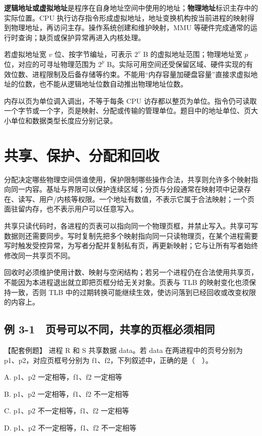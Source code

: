 \textbf{逻辑地址或虚拟地址}是程序在自身地址空间中使用的地址；\textbf{物理地址}标识主存中的实际位置。CPU 执行访存指令形成虚拟地址，地址变换机构按当前进程的映射得到物理地址，再访问主存。操作系统创建和维护映射，MMU 等硬件完成通常的运行时查询；缺页或保护异常再进入内核处理。

若虚拟地址宽 \(v\) 位、按字节编址，可表示 \(2^v\) B 的虚拟地址范围；物理地址宽 \(p\) 位，对应的可寻址物理范围为 \(2^p\) B。实际可用空间还受保留区域、硬件实现的有效位数、进程限制及后备存储等约束。不能用``内存容量加硬盘容量''直接求虚拟地址的位数，也不能从逻辑地址位数自动推出物理地址位数。

内存以页为单位调入调出，不等于每条 CPU 访存都以整页为单位。指令仍可读取一个字节或一个字，页是映射、分配或传输的管理单位。题目中的地址单位、页大小单位和数据类型长度应分别记录。

\section{共享、保护、分配和回收}\label{OS03-5-2}

分配决定哪些物理空间供谁使用，保护限制哪些操作合法，共享则允许多个映射指向同一内容。基址与界限可以保护连续区域；分页与分段通常在映射项中记录存在、读写、用户/内核等权限。一个地址有数值，不表示它属于合法映射；一个页面驻留内存，也不表示用户可以任意写入。

共享只读代码时，各进程的页表可以指向同一个物理页框，并禁止写入。共享可写数据则还需要同步。写时复制先把多个映射指向同一只读物理页，在某个进程需要写时触发受控异常，为写者分配并复制私有页，再更新映射；它与让所有写者始终修改同一共享页不同。

回收时必须维护使用计数、映射与空闲结构；若另一个进程仍在合法使用共享页，不能因为本进程退出就立即把页框分给无关对象。页表与 TLB 的映射变化也须保持一致，否则 TLB 中的过期转换可能继续生效，使访问落到已经回收或改变权限的内容上。

\subsection{例 3-1　页号可以不同，共享的页框必须相同}\label{OS03-ex5-1}

\begin{example}[配套例题]

【配套例题】 进程 R 和 S 共享数据 data。若 data 在两进程中的页号分别为 p1、p2，对应页框号分别为 f1、f2，下列叙述中，正确的是（　）。

A. p1、p2 一定相等，f1、f2 一定相等

B. p1、p2 一定相等，f1、f2 不一定相等

C. p1、p2 不一定相等，f1、f2 一定相等

D. p1、p2 不一定相等，f1、f2 不一定相等

\end{example}

